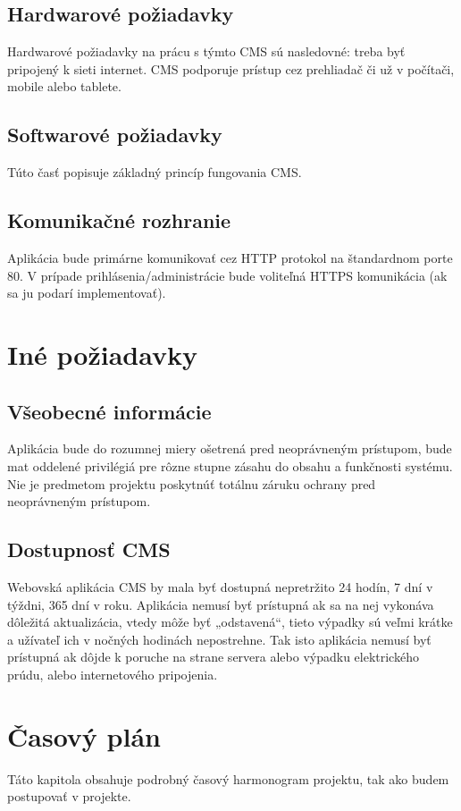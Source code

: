 \documentclass[a4paper,titlepage,11pt]{article}
\begin{document}
\subsection{Hardwarové požiadavky}
Hardwarové požiadavky na prácu s týmto CMS sú nasledovné: treba byť pripojený k sieti internet. 
CMS podporuje prístup cez prehliadač či už v počítači, mobile alebo tablete. 

\subsection{Softwarové požiadavky}
Túto časť popisuje základný princíp fungovania CMS. 

\subsection{Komunikačné rozhranie}
Aplikácia bude primárne komunikovať cez HTTP protokol na štandardnom porte 80. V prípade prihlásenia\slash administrácie bude voliteľná HTTPS komunikácia (ak sa ju podarí implementovať).

\newpage
\section{Iné požiadavky}
\subsection{Všeobecné informácie}
Aplikácia bude do rozumnej miery ošetrená pred neoprávneným prístupom, bude mat oddelené privilégiá pre rôzne stupne zásahu do obsahu a funkčnosti systému. Nie je predmetom projektu poskytnúť totálnu záruku ochrany pred neoprávneným prístupom.
 
\subsection{Dostupnosť CMS}
Webovská aplikácia CMS by mala byť dostupná nepretržito 24 hodín, 7 dní v týždni, 365 dní v roku. 
Aplikácia nemusí byť prístupná ak sa na nej vykonáva dôležitá aktualizácia, vtedy môže byť „odstavená“, tieto výpadky sú veľmi krátke a užívateľ ich v nočných hodinách nepostrehne. 
Tak isto aplikácia nemusí byť prístupná ak dôjde k poruche na strane servera alebo výpadku elektrického prúdu, alebo internetového pripojenia.

\newpage
\section{Časový plán}
Táto kapitola obsahuje podrobný časový harmonogram projektu, tak ako budem postupovať v projekte. 
\end{document}
